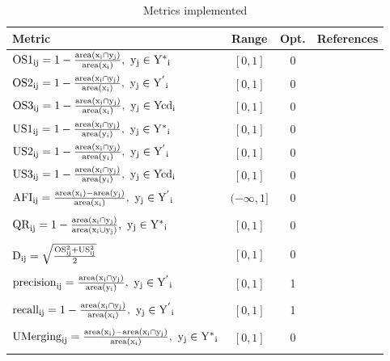 \begin{table}[htbp]
\setlength\extrarowheight{10pt}
\centering
\caption{Metrics implemented}
\label{tab:metrics}
\small
\begin{tabular}{lccl}
\toprule
Metric   &  Range  &  Opt.  &  References \\
\midrule
 $\rm{OS1}_{ij}=1-\frac{area(x_i\cap y_j)}{area(x_i)},\ y_j\in {Y^*}_i$ & $[0,1]$ & 0 & \citet{Clinton2010}  \\
 $\rm{OS2}_{ij}=1-\frac{area(x_i\cap y_j)}{area(x_i)},\ y_j\in {Y^{'}}_i$ & $[0,1]$ & 0 & \citet{Persello2010}  \\
 $\rm{OS3}_{ij}=1-\frac{area(x_i\cap y_j)}{area(x_i)},\ y_j\in {Ycd}_i$ & $[0,1]$ & 0 & \citet{Yang2014}  \\
 $\rm{US1}_{ij}=1-\frac{area(x_i\cap y_j)}{area(y_i)},\ y_j\in {Y^*}_i$ & $[0,1]$ & 0 & \citet{Clinton2010}  \\
 $\rm{US2}_{ij}=1-\frac{area(x_i\cap y_j)}{area(y_i)},\ y_j\in {Y^{'}}_i$ & $[0,1]$ & 0 & \citet{Persello2010}  \\
 $\rm{US3}_{ij}=1-\frac{area(x_i\cap y_j)}{area(y_i)},\ y_j\in {Ycd}_i$ & $[0,1]$ & 0 & \citet{Yang2014}  \\
 $\rm{AFI}_{ij}=\frac{area(x_i)-area(y_j)}{area(x_i)},\ y_j\in {Y^{'}}_i$ & $(-\infty,1]$ & 0 & \shortstack[l]{\citet{Lucieer2002};\\  \citet{Clinton2010}}  \\
 $\rm{QR}_{ij}=1-\frac{area(x_i\cap y_j)}{area(x_i\cup y_j)},\ y_j\in {Y^*}_i$ & $[0,1]$ & 0 & \shortstack[l]{\citet{Weidner2008};\\ \citet{Clinton2010}}  \\
 $\rm{D}_{ij}=\sqrt{\frac{\rm{OS}_{ij}^2+\rm{US}_{ij}^2}{2}}$ & $[0,1]$ & 0 & \shortstack[l]{\citet{Levine1982}; \\ \citet{Clinton2010}} \\
 $\rm{precision}_{ij}=\frac{area(x_i\cap y_j)}{area(y_i)},\ y_j\in {Y^{'}}_i$ & $[0,1]$ & 1 & \shortstack[l]{\citet{vanRijsbergen1979};\\ \citet{Zhang2015}}  \\
 $\rm{recall}_{ij}=1-\frac{area(x_i\cap y_j)}{area(x_i)},\ y_j\in {Y^{'}}_i$ & $[0,1]$ & 1 & \shortstack[l]{\citet{vanRijsbergen1979};\\ \citet{Zhang2015}}  \\
 $\rm{UMerging}_{ij}=\frac{area(x_i)-area(x_i\cap y_j)}{area(x_i)},\ y_j\in {Y^*}_i$ & $[0,1]$ & 0 & \shortstack[l]{\citet{Levine1982};\\ \citet{Clinton2010}} \\

\end{tabular}
\end{table}
